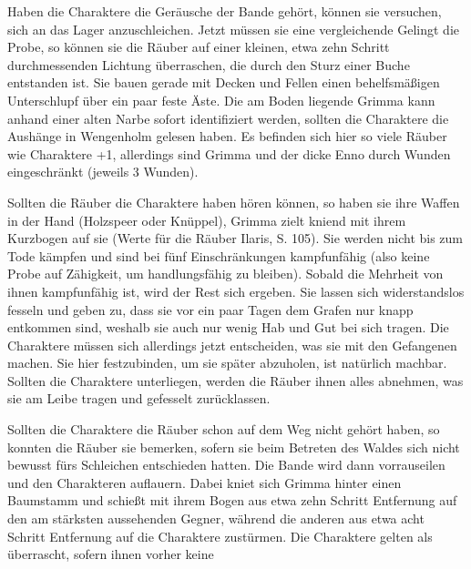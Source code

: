 Haben die Charaktere die Geräusche der Bande gehört, können sie versuchen, sich an das Lager anzuschleichen. Jetzt müssen sie eine vergleichende
\platz
{}
\platz
Gelingt die Probe, so können sie die Räuber auf einer kleinen, etwa zehn Schritt durchmessenden Lichtung überraschen, die durch den Sturz einer Buche entstanden ist. Sie bauen gerade mit Decken und Fellen einen behelfsmäßigen Unterschlupf über ein paar feste Äste. Die am Boden liegende Grimma kann anhand einer alten Narbe sofort identifiziert werden, sollten die Charaktere die Aushänge in Wengenholm gelesen haben. Es befinden sich hier so viele Räuber wie Charaktere +1, allerdings sind Grimma und der dicke Enno durch Wunden eingeschränkt (jeweils 3 Wunden).


Sollten die Räuber die Charaktere haben hören können, so haben sie ihre Waffen in der Hand (Holzspeer oder Knüppel), Grimma zielt kniend mit ihrem Kurzbogen auf sie (Werte für die Räuber Ilaris, S. 105). Sie werden nicht bis zum Tode kämpfen und sind bei fünf Einschränkungen kampfunfähig (also keine Probe auf Zähigkeit, um handlungsfähig zu bleiben). Sobald die Mehrheit von ihnen kampfunfähig ist, wird der Rest sich ergeben. Sie lassen sich widerstandslos fesseln und geben zu, dass sie vor ein paar Tagen dem Grafen nur knapp entkommen sind, weshalb sie auch nur wenig Hab und Gut bei sich tragen. Die Charaktere müssen sich allerdings jetzt entscheiden, was sie mit den Gefangenen machen. Sie hier festzubinden, um sie später abzuholen, ist natürlich machbar.
Sollten die Charaktere unterliegen, werden die Räuber ihnen alles abnehmen, was sie am Leibe tragen und gefesselt zurücklassen. 


Sollten die Charaktere die Räuber schon auf dem Weg nicht gehört haben, so konnten die Räuber sie bemerken, sofern sie beim Betreten des Waldes sich nicht bewusst fürs Schleichen entschieden hatten. Die Bande wird dann vorrauseilen und den Charakteren auflauern. Dabei kniet sich Grimma hinter einen Baumstamm und schießt mit ihrem Bogen aus etwa zehn Schritt Entfernung auf den am stärksten aussehenden Gegner, während die anderen aus etwa acht Schritt Entfernung auf die Charaktere zustürmen. Die Charaktere gelten als überrascht, sofern ihnen vorher keine 
\platz
{}

